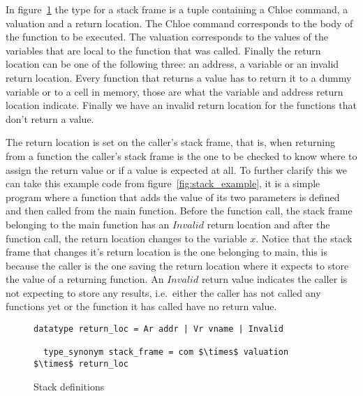 In figure~\ref{fig:stack_def} the type for a stack frame is a tuple containing a Chloe command, a valuation and a return location.
The Chloe command corresponds to the body of the function to be executed.
The valuation corresponds to the values of the variables that are local to the function that was called.
Finally the return location can be one of the following three: an address, a variable or an invalid return location.
Every function that returns a value has to return it to a dummy variable or to a cell in memory, those are what the variable and address return location indicate.
Finally we have an invalid return location for the functions that don't return a value.

The return location is set on the caller's stack frame, that is, when returning from a function the caller's stack frame is the one to be checked to know where to assign the return value or if a value is expected at all.
To further clarify this we can take this example code from figure~\ref{fig:stack_example}, it is a simple program where a function that adds the value of its two parameters is defined and then called from the main function.
Before the function call, the stack frame belonging to the main function has an $Invalid$ return location and after the function call, the return location changes to the variable $x$.
Notice that the stack frame that changes it's return location is the one belonging to main, this is because the caller is the one saving the return location where it expects to store the value of a returning function.
An $Invalid$ return value indicates the caller is not expecting to store any results, i.e.\ either the caller has not called any functions yet or the function it has called have no return value.

\begin{figure}
  \begin{lstlisting}[frame=single, mathescape=true]
  datatype return_loc = Ar addr | Vr vname | Invalid

  type_synonym stack_frame = com $\times$ valuation $\times$ return_loc
  \end{lstlisting}

  \caption{Stack definitions}
  \label{fig:stack_def}
\end{figure}


